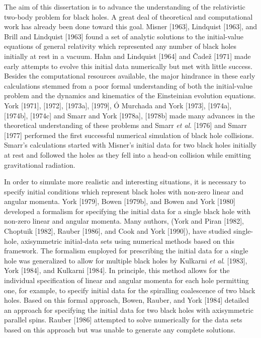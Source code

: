 The aim of this dissertation is to advance the understanding of the relativistic
two-body problem for black holes.  A great deal of theoretical and computational
work has already been done toward this goal.  Misner [1963], Lindquist [1963],
and Brill and Lindquist [1963] found a set of analytic solutions to the
initial-value equations of general relativity which represented any number of
black holes initially at rest in a vacuum.  Hahn and Lindquist [1964] and \v
Cade\v z [1971] made early attempts to evolve this initial data numerically but
met with little success.  Besides the computational resources available, the
major hindrance in these early calculations stemmed from a poor formal
understanding of both the initial-value problem and the dynamics and kinematics
of the Einsteinian evolution equations.  York [1971], [1972], [1973a], [1979],
\'{O} Murchada and York [1973], [1974a], [1974b], [1974c] and Smarr and York
[1978a], [1978b] made many advances in the theoretical understanding of these
problems and Smarr {\it et al}. [1976] and Smarr [1977] performed the first
successful numerical simulation of black hole collisions.  Smarr's calculations
started with Misner's initial data for two black holes initially at rest and
followed the holes as they fell into a head-on collision while emitting
gravitational radiation.

In order to simulate more realistic and interesting situations, it is necessary
to specify initial conditions which represent black holes with non-zero linear
and angular momenta.  York [1979], Bowen [1979b], and Bowen and York [1980]
developed a formalism for specifying the initial data for a single black hole
with non-zero linear and angular momenta.  Many authors, (York and Piran
[1982], Choptuik [1982], Rauber [1986], and Cook and York [1990]), have studied
single-hole, axisymmetric initial-data sets using numerical methods based on
this framework.  The formalism employed for prescribing the initial data for a
single hole was generalized to allow for multiple black holes by Kulkarni {\it
et al}. [1983], York [1984], and Kulkarni [1984].  In principle, this method
allows for the individual specification of linear and angular momenta for each
hole permitting one, for example, to specify initial data for the spiralling
coalescence of two black holes.  Based on this formal approach, Bowen, Rauber,
and York [1984] detailed an approach for specifying the initial data for two
black holes with axisymmetric parallel spins.  Rauber [1986] attempted to solve
numerically for the data sets based on this approach but was unable to generate
any complete solutions.

